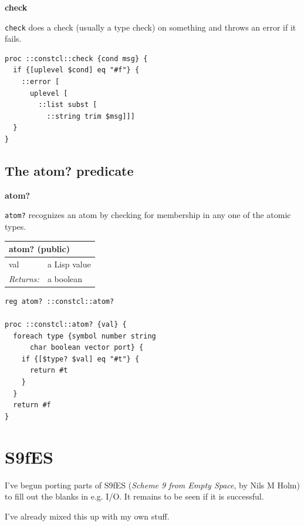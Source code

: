 \documentclass[twoside,9pt]{report}
\begin{document}
\textbf{check}


\texttt{check} does a check (usually a type check) on something and throws an error if it fails.

\noindent\makebox[\linewidth]{\rule{\linewidth}{0.4pt}}
\begin{lstlisting}
proc ::constcl::check {cond msg} {
  if {[uplevel $cond] eq "#f"} {
    ::error [
      uplevel [
        ::list subst [
          ::string trim $msg]]]
  }
}
\end{lstlisting}
\noindent\makebox[\linewidth]{\rule{\linewidth}{0.4pt}}
\section{The atom? predicate}
\label{the-atom?-predicate}

\textbf{atom?}


\texttt{atom?} recognizes an atom by checking for membership in any one of the atomic types.

\begin{tabular}{ |l l| }
\hline
\multicolumn{2}{|l|}{atom? (public)} \\
\hline
val & a Lisp value \\
\textit{Returns:} & a boolean \\
\hline
\end{tabular}

\noindent\makebox[\linewidth]{\rule{\linewidth}{0.4pt}}
\begin{lstlisting}
reg atom? ::constcl::atom?
 
proc ::constcl::atom? {val} {
  foreach type {symbol number string
      char boolean vector port} {
    if {[$type? $val] eq "#t"} {
      return #t
    }
  }
  return #f
}
\end{lstlisting}
\noindent\makebox[\linewidth]{\rule{\linewidth}{0.4pt}}
\chapter{S9fES}
\label{s9fes}

I've begun porting parts of S9fES (\emph{Scheme 9 from Empty Space}, by Nils M Holm) to fill out the blanks in e.g. I/O. It remains to be seen if it is successful.


I've already mixed this up with my own stuff.
\end{document}
